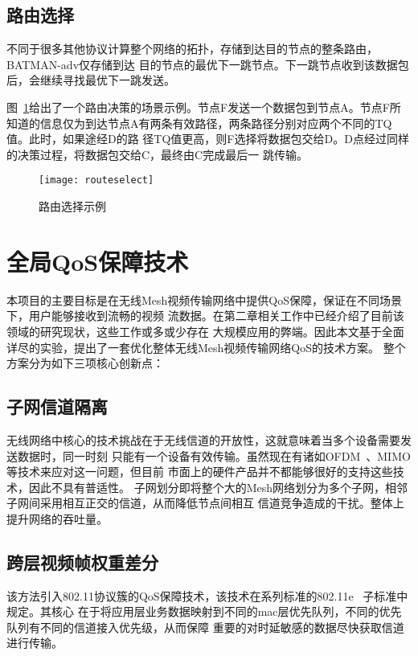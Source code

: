 \subsection{路由选择}
不同于很多其他协议计算整个网络的拓扑，存储到达目的节点的整条路由，BATMAN-adv仅存储到达
目的节点的最优下一跳节点。下一跳节点收到该数据包后，会继续寻找最优下一跳发送。

图~\ref{fig:routeselect}给出了一个路由决策的场景示例。节点F发送一个数据包到节点A。节点F所
知道的信息仅为到达节点A有两条有效路径，两条路径分别对应两个不同的TQ值。此时，如果途经D的路
径TQ值更高，则F选择将数据包交给D。D点经过同样的决策过程，将数据包交给C，最终由C完成最后一
跳传输。

\begin{figure}[H] %
  \centering
  \texttt{[image: routeselect]}
  \caption{路由选择示例}
  \label{fig:routeselect}
\end{figure}

\section{全局QoS保障技术}
本项目的主要目标是在无线Mesh视频传输网络中提供QoS保障，保证在不同场景下，用户能够接收到流畅的视频
流数据。在第二章相关工作中已经介绍了目前该领域的研究现状，这些工作或多或少存在
大规模应用的弊端。因此本文基于全面详尽的实验，提出了一套优化整体无线Mesh视频传输网络QoS的技术方案。
整个方案分为如下三项核心创新点：

\subsection{子网信道隔离}
    无线网络中核心的技术挑战在于无线信道的开放性，这就意味着当多个设备需要发送数据时，同一时刻
只能有一个设备有效传输。虽然现在有诸如OFDM~\cite{OFDM}、MIMO
等技术来应对这一问题，但目前
市面上的硬件产品并不都能够很好的支持这些技术，因此不具有普适性。
    子网划分即将整个大的Mesh网络划分为多个子网，相邻子网间采用相互正交的信道，从而降低节点间相互
信道竞争造成的干扰。整体上提升网络的吞吐量。

\subsection{跨层视频帧权重差分}
    该方法引入802.11协议簇的QoS保障技术，该技术在系列标准的802.11e~\cite{IEEE80211e}
    子标准中规定。其核心
在于将应用层业务数据映射到不同的mac层优先队列，不同的优先队列有不同的信道接入优先级，从而保障
重要的对时延敏感的数据尽快获取信道进行传输。

